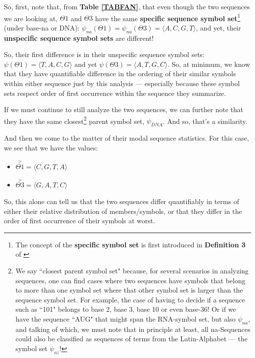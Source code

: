 \documentclass[a4paper, 18pt]{book} %
\begin{document}
So, first, note that, from \textbf{Table \ref{TABFAN}}, that even though the two sequences we are looking at, $\Theta1$ and $\Theta3$ have the same \textbf{specific sequence symbol set}\footnote{The concept of the \textbf{specific symbol set} is first introduced in \textbf{Definition 3} of \cite{ossipaper}} (under base-na or DNA): $\psi_{na}(\Theta1) = \psi_{na}(\Theta3) = \langle A, C, G, T \rangle$, and yet, their \textbf{unspecific sequence symbol sets} are different! 

So, their first difference is in their unspecific sequence symbol sets: $\psi(\Theta1) = \langle T, A, C, G\rangle$ and yet $\psi(\Theta3) = \langle A, T, G, C\rangle$. So, at minimum, we know that they have quantifiable difference in the ordering of their similar symbols within either sequence just by this analysis --- especially because these symbol sets respect order of first occurrence within the sequence they summarize.

If we must continue to still analyze the two sequences, we can further note that they have the same closest\footnote{We say ``closest parent symbol set" because, for several scenarios in analyzing sequences, one can find cases where two sequences have symbols that belong to more than one symbol set where that other symbol set is larger than the sequence symbol set. For example, the case of having to decide if a sequence such as ``101" belongs to base 2, base 3, base 10 or even base-36! Or if we have the sequence ``AUG" that might span the RNA-symbol set, but also $\psi_{na}$, and talking of which, we must note that in principle at least, all na-Sequences could also be classified as sequences of terms from the Latin-Alphabet --- the symbol set $\psi_{az}$!} parent symbol set, $\psi_{DNA}$. And so, that's a similarity.

And then we come to the matter of their modal sequence statistics. For this case, we see that we have the values: 

\begin{itemize}
\item $\overset{>}{\Theta1} = \langle C, G, T, A \rangle$
\item $\overset{>}{\Theta3} = \langle G, A, T, C \rangle$
\end{itemize}

So, this alone can tell us that the two sequences differ quantifiably in terms of either their relative distribution of members/symbols, or that they differ in the order of first occurrence of their symbols at worst.
\end{document}
